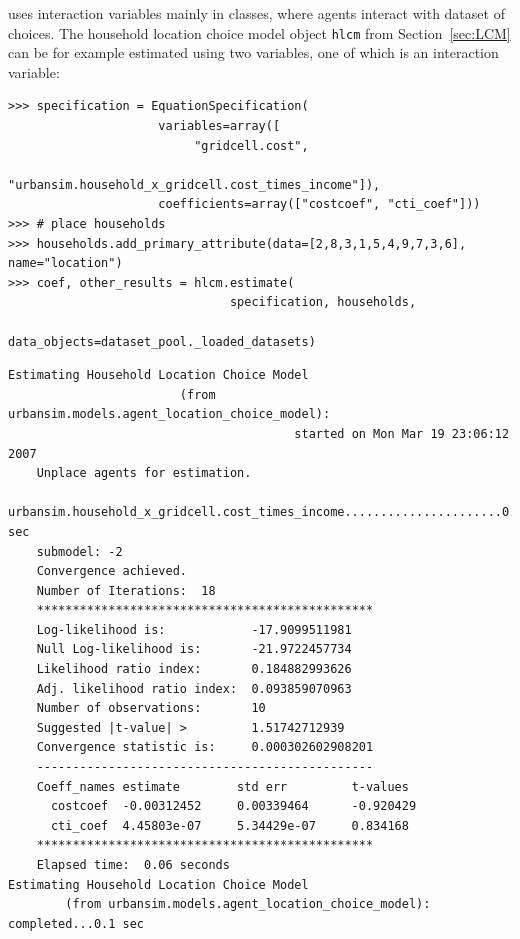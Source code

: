  uses interaction variables \variablesindex mainly in  classes, where agents
interact with dataset \datasetindex of choices. The household location choice model object
\verb|hlcm| from Section~\ref{sec:LCM} can be for example estimated using two
variables, \variablesindex one of which is an interaction variable: \variablesindex
\primaryattributesindex
\begin{verbatim}
>>> specification = EquationSpecification(
                     variables=array([
                          "gridcell.cost",
                          "urbansim.household_x_gridcell.cost_times_income"]),
                     coefficients=array(["costcoef", "cti_coef"]))
>>> # place households
>>> households.add_primary_attribute(data=[2,8,3,1,5,4,9,7,3,6], name="location")
>>> coef, other_results = hlcm.estimate(
                               specification, households,
                               data_objects=dataset_pool._loaded_datasets)
\end{verbatim}
\coefficientsindex
\begin{verbatim}
Estimating Household Location Choice Model
                        (from urbansim.models.agent_location_choice_model):
                                        started on Mon Mar 19 23:06:12 2007
    Unplace agents for estimation.
    urbansim.household_x_gridcell.cost_times_income......................0.0 sec
    submodel: -2
    Convergence achieved.
    Number of Iterations:  18
    ***********************************************
    Log-likelihood is:            -17.9099511981
    Null Log-likelihood is:       -21.9722457734
    Likelihood ratio index:       0.184882993626
    Adj. likelihood ratio index:  0.093859070963
    Number of observations:       10
    Suggested |t-value| >         1.51742712939
    Convergence statistic is:     0.000302602908201
    -----------------------------------------------
    Coeff_names estimate        std err         t-values
      costcoef  -0.00312452     0.00339464      -0.920429
      cti_coef  4.45803e-07     5.34429e-07     0.834168
    ***********************************************
    Elapsed time:  0.06 seconds
Estimating Household Location Choice Model
        (from urbansim.models.agent_location_choice_model): completed...0.1 sec
\end{verbatim}
\label{page:iv-spec}

%

